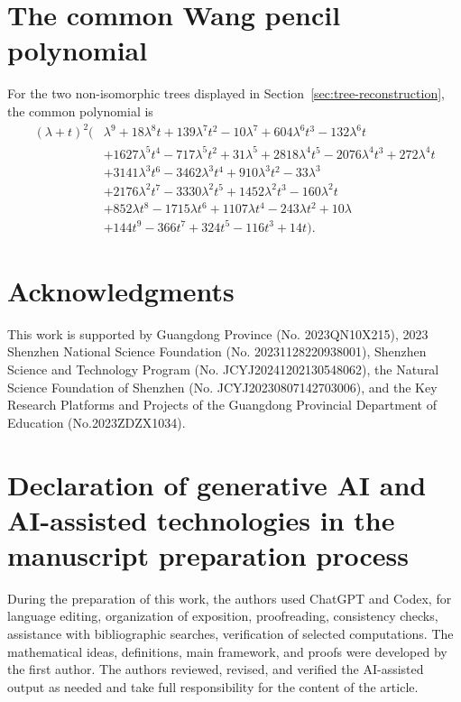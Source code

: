 \documentclass[a4paper,fleqn]{cas-sc}
\theoremstyle{definition}
\theoremstyle{remark}
\begin{document}
\section{The common Wang pencil polynomial}
\label{app:wang-pencil}

For the two non-isomorphic trees displayed in Section~\ref{sec:tree-reconstruction}, the common
polynomial is
\[
\begin{aligned}
(\lambda+t)^2\bigl(&
\lambda^9+18\lambda^8t+139\lambda^7t^2-10\lambda^7
+604\lambda^6t^3-132\lambda^6t\\
&+1627\lambda^5t^4-717\lambda^5t^2+31\lambda^5
+2818\lambda^4t^5-2076\lambda^4t^3+272\lambda^4t\\
&+3141\lambda^3t^6-3462\lambda^3t^4+910\lambda^3t^2-33\lambda^3\\
&+2176\lambda^2t^7-3330\lambda^2t^5+1452\lambda^2t^3-160\lambda^2t\\
&+852\lambda t^8-1715\lambda t^6+1107\lambda t^4-243\lambda t^2+10\lambda\\
&+144t^9-366t^7+324t^5-116t^3+14t
\bigr).
\end{aligned}
\]



\section*{Acknowledgments} This work is supported by Guangdong Province (No. 2023QN10X215), 2023 Shenzhen National Science Foundation (No. 20231128220938001), Shenzhen Science and Technology Program (No. JCYJ20241202130548062), the Natural Science Foundation of Shenzhen (No. JCYJ20230807142703006), and the Key Research Platforms and Projects of the Guangdong Provincial Department of Education (No.2023ZDZX1034). 






\section*{Declaration of generative AI and AI-assisted technologies in the manuscript preparation process}

During the preparation of this work, the authors used ChatGPT and Codex, for language editing, organization of exposition, proofreading, consistency checks, assistance with
bibliographic searches, verification of selected computations. The mathematical ideas, definitions, main framework, and proofs were developed by the first author. The authors reviewed, revised, and verified the AI-assisted output as needed and take full responsibility for the content of the article.







\end{document}
